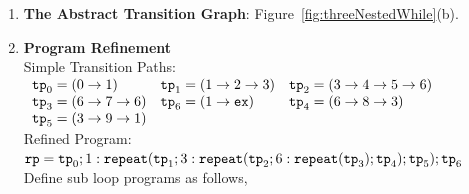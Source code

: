 \begin{enumerate}
  \item  \textbf{The Abstract Transition Graph}: Figure~\ref{fig:threeNestedWhile}(b).

  \item \textbf{Program Refinement}
  \\
  {Simple Transition Paths:}
  \\
$
      \begin{array}{llll}
          \mathtt{tp}_0 = (0 \to 1)
          &
          \mathtt{tp}_1 = (1 \to 2 \to 3)
          &           
          \mathtt{tp}_2 = (3 \to 4 \to 5 \to 6)
          \\
          \mathtt{tp}_3 = (6 \to 7 \to 6)
          &
          \mathtt{tp}_6 = (1 \to \mathtt{ex})
          &
          \mathtt{tp}_4 = (6 \to 8 \to 3)
          \\
          \mathtt{tp}_5 = (3 \to 9 \to 1)
      \end{array}
$
  \\
  Refined Program:
\\
$
  \mathtt{rp} = \mathtt{tp}_0 ; 
1: \mathtt{repeat}(\mathtt{tp}_1; 3: \mathtt{repeat}(\mathtt{tp}_2; 6: \mathtt{repeat}(\mathtt{tp}_3); \mathtt{tp}_4); \mathtt{tp}_5); \mathtt{tp}_6
$
\\
Define sub loop programs as follows,


\end{enumerate}
